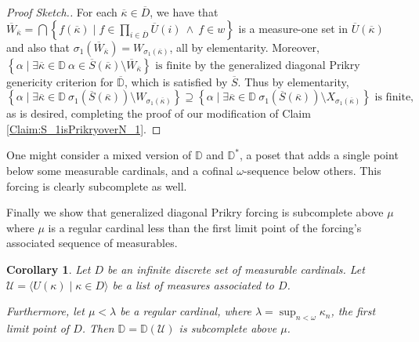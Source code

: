 \documentclass{amsart}
\newtheorem{corollary}[theorem]{Corollary}
\theoremstyle{definition}
\theoremstyle{remark}
\newcommand{\D}{\mathbb{D}}
\renewcommand{\S}{{\overline{S}}}
\newcommand{\U}{\mathcal{U}}
\newcommand{\st}{\; | \;}
\newcommand{\set}[2]{\left\{#1\st #2 \right\}}
\newcommand{\seq}[2]{\langle #1 \st #2 \rangle}
\begin{document}
\begin{proof}[Proof Sketch.]
For each $\overline \kappa \in \overline D$, we have that $\overline W_{\overline \kappa} = \bigcap \set{f(\overline \kappa) }{ f \in \prod_{i\in \overline D} \overline U(i) \ \land \ f \in w }$ is a measure-one set in $\overline U(\overline \kappa)$ and also that $\sigma_1(\overline W_{\overline \kappa}) = W_{\sigma_1(\overline \kappa)}$, all by elementarity. Moreover, 
$\set{ \alpha }{ \exists \overline \kappa \in \D \ \alpha \in \overline S(\overline \kappa) \setminus \overline W_{\overline \kappa} } \text{ is finite}$ by the generalized diagonal Prikry genericity criterion for $\overline{\D}$, which is satisfied by $\overline S$.
Thus by elementarity,
$$\set{ \alpha }{ \exists \overline \kappa \in \D \ \sigma_1(\S(\overline \kappa)) \setminus W_{\sigma_1(\overline \kappa)} } \supseteq \set{ \alpha }{ \exists \overline \kappa \in \D \ \sigma_1(\S(\overline \kappa)) \setminus X_{\sigma_1(\overline \kappa)}} \text{ is finite,}$$
as is desired, completing the proof of our modification of Claim \ref{Claim:S_1isPrikryoverN_1}. 
\end{proof}

One might consider a mixed version of $\D$ and $\D^*$, a poset that adds a single point below some measurable cardinals, and a cofinal $\omega$-sequence below others. This forcing is clearly subcomplete as well.

Finally we show that generalized diagonal Prikry forcing is subcomplete above $\mu$ where $\mu$ is a regular cardinal less than the first limit point of the forcing's associated sequence of measurables.

\begin{corollary}\label{corollary:SCaboveMu} Let $D$ be an infinite discrete set of measurable cardinals. Let $\U = \seq{ U(\kappa) }{ \kappa \in D }$ be a list of measures associated to $D$. 

Furthermore, let $\mu < \lambda$ be a regular cardinal, where $\lambda = \sup_{n<\omega} \kappa_n$, the first limit point of $D$.
Then $\D=\D(\U)$ is subcomplete above $\mu$. \end{corollary}
\end{document}
